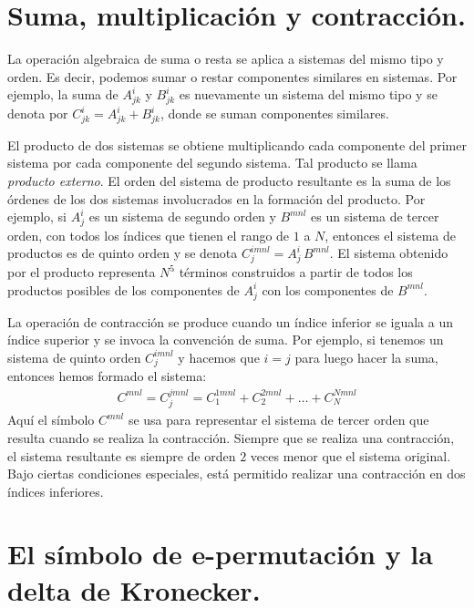 \section{Suma, multiplicación y contracción.}

La operación algebraica de suma o resta se aplica a sistemas del mismo tipo y orden. Es decir, podemos sumar o restar componentes similares en sistemas. Por ejemplo, la suma de $A_{jk}^{i}$ y $B_{jk}^{i}$ es nuevamente un sistema del mismo tipo y se denota por $C_{jk}^{i} = A_{jk}^{i} + B_{jk}^{i}$, donde se suman componentes similares.
\par
El producto de dos sistemas se obtiene multiplicando cada componente del primer sistema por cada componente del segundo sistema. Tal producto se llama \emph{producto externo}. El orden del sistema de producto resultante es la suma de los órdenes de los dos sistemas involucrados en la formación del producto. Por ejemplo, si $A_{j}^{i}$ es un sistema de segundo orden y $B^{mnl}$ es un sistema de tercer orden, con todos los índices que tienen el rango de $1$ a $N$, entonces el sistema de productos es de quinto orden y se denota $C_{j}^{imnl} = A_{j}^{i} \, B^{mnl}$. El sistema obtenido por el producto representa $N^{5}$ términos construidos a partir de todos los productos posibles de los componentes de $A_{j}^{i}$ con los componentes de $B^{mnl}$.
\par
La operación de contracción se produce cuando un índice inferior se iguala a un índice superior y se invoca la convención de suma. Por ejemplo, si tenemos un sistema de quinto orden $C_{j}^{imnl}$ y hacemos que $i = j$ para luego hacer la suma, entonces hemos formado el sistema:
\begin{align*}
C^{mnl} = C_{j}^{jmnl} = C_{1}^{1mnl} + C_{2}^{2mnl} + \ldots + C_{N}^{Nmnl}
\end{align*}
Aquí el símbolo $C^{mnl}$ se usa para representar el sistema de tercer orden que resulta cuando se realiza la contracción. Siempre que se realiza una contracción, el sistema resultante es siempre de orden $2$ veces menor que el sistema original. Bajo ciertas condiciones especiales, está permitido realizar una contracción en dos índices inferiores.

\section{El símbolo de e-permutación y la delta de Kronecker.}

